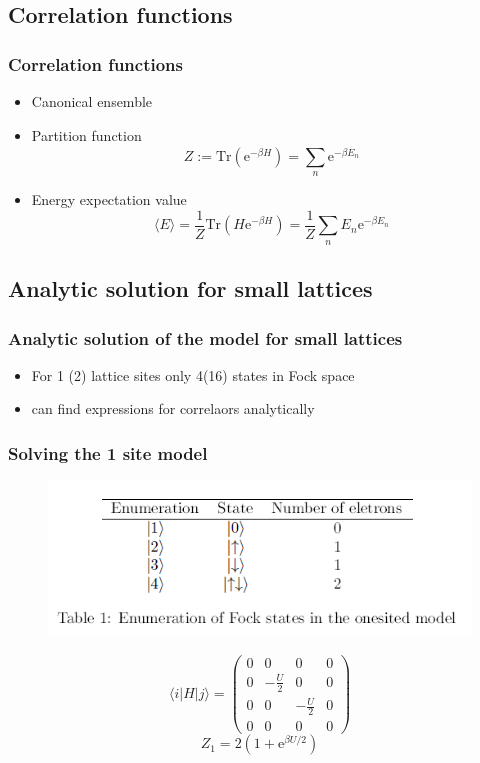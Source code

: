 \documentclass{beamer}
\begin{document}
\subsection{Correlation functions}
\begin{frame}
\frametitle{Correlation functions}
\begin{itemize}
	\item Canonical ensemble
	\item Partition function 
	\begin{equation*}
	Z := \text{Tr}(\text{e}^{-\beta H}) = \sum_{n}^{}\text{e}^{-\beta E_n} \label{partition}
	\end{equation*}
\item Energy expectation value
\begin{equation}
\langle{E}\rangle = \frac{1}{Z}\text{Tr} (H\text{e}^{-\beta H}) =\frac{1}{Z} \sum_{n}^{} E_n\text{e}^{-\beta E_n} \label{energy}
\end{equation}	
\end{itemize}
\end{frame}
\subsection[Analytic solutions]{Analytic solution for small lattices}
\begin{frame}
\frametitle{Analytic solution of the model for small lattices}
\begin{itemize}
\item For 1 (2) lattice sites only 4(16) states in Fock space
\item can find expressions for correlaors analytically
\end{itemize}
\end{frame}



\begin{frame}
\frametitle{Solving the 1 site model}

\begin{figure}[h]
	\centering
	\includegraphics[width=0.7\linewidth]{states}
	\label{fig:states1}
\end{figure}
\begin{equation*}
\langle i|H|j\rangle=
\begin{pmatrix}
0 & 0 & 0&0\\
0 & -\frac{U}{2} & 0&0\\
0 & 0 & -\frac{U}{2}&0\\
0 & 0 & 0&0
\end{pmatrix}
\end{equation*}
\begin{equation}
Z_{1}= 2 (1+\text{e}^{\beta U/2})
\label{partition1}
\end{equation}
\end{frame}
\end{document}
